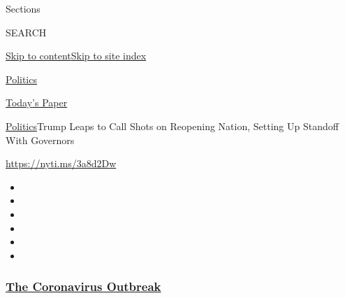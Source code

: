 Sections

SEARCH

\protect\hyperlink{site-content}{Skip to
content}\protect\hyperlink{site-index}{Skip to site index}

\href{https://www.nytimes3xbfgragh.onion/section/politics}{Politics}

\href{https://myaccount.nytimes3xbfgragh.onion/auth/login?response_type=cookie\&client_id=vi}{}

\href{https://www.nytimes3xbfgragh.onion/section/todayspaper}{Today's
Paper}

\href{/section/politics}{Politics}\textbar{}Trump Leaps to Call Shots on
Reopening Nation, Setting Up Standoff With Governors

\url{https://nyti.ms/3a8d2Dw}

\begin{itemize}
\item
\item
\item
\item
\item
\item
\end{itemize}

\hypertarget{the-coronavirus-outbreak}{%
\subsubsection{\texorpdfstring{\href{https://www.nytimes3xbfgragh.onion/news-event/coronavirus?name=styln-coronavirus-national\&region=TOP_BANNER\&block=storyline_menu_recirc\&action=click\&pgtype=Article\&impression_id=7bb57520-f4bc-11ea-bc13-db3a9dba292a\&variant=undefined}{The
Coronavirus
Outbreak}}{The Coronavirus Outbreak}}\label{the-coronavirus-outbreak}}

